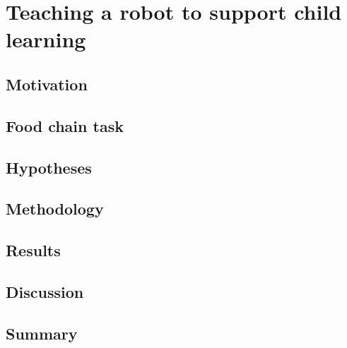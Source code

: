 \chapter{Teaching a robot to support child learning}\label{chap:education}

\section{Motivation}

\section{Food chain task}

\section{Hypotheses}

\section{Methodology}

\section{Results}

\section{Discussion}

\section{Summary}

